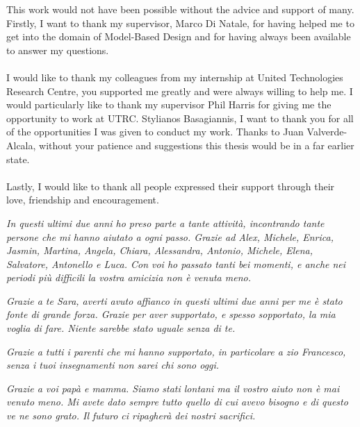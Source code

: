 
\begin{acknowledgements}      

This work would not have been possible without the advice and support of many. Firstly, I want to thank my supervisor, Marco Di Natale, for having helped me to get into the domain of Model-Based Design and for having always been available to answer my questions. %

\paragraph{} I would like to thank my colleagues from my internship at United Technologies Research Centre, you supported me greatly and were always willing to help me. I would particularly like to thank my supervisor Phil Harris for giving me the opportunity to work at UTRC. Stylianos Basagiannis, I want to thank you for all of the opportunities I was given to conduct my work. Thanks to Juan Valverde-Alcala, without your patience and suggestions this thesis would be in a far earlier state.


\paragraph{} Lastly, I would like to thank all people expressed their support through their love, friendship and encouragement.
\par\textit{In questi ultimi due anni ho preso parte a tante attivit\`{a}, incontrando tante persone che mi hanno aiutato a ogni passo. Grazie ad Alex, Michele, Enrica, Jasmin, Martina, Angela, Chiara, Alessandra, Antonio, Michele, Elena, Salvatore, Antonello e Luca. Con voi ho passato tanti bei momenti, e anche nei periodi pi\`{u} difficili la vostra amicizia non \`{e} venuta meno.}
\par\textit{Grazie a te Sara, averti avuto affianco in questi ultimi due anni per me \`{e} stato fonte di grande forza. Grazie per aver supportato, e spesso sopportato, la mia voglia di fare. Niente sarebbe stato uguale senza di te.}
\par\textit{Grazie a tutti i parenti che mi hanno supportato, in particolare a zio Francesco, senza i tuoi insegnamenti non sarei chi sono oggi.}
\par \emph{Grazie a voi pap\`{a} e mamma. Siamo stati lontani ma il vostro aiuto non \`{e} mai venuto meno. Mi avete dato sempre tutto quello di cui avevo bisogno e di questo ve ne sono grato. Il futuro ci ripagher\`{a} dei nostri sacrifici.}


{\raggedleft\vfill\itshape{}\par
}


\end{acknowledgements}
